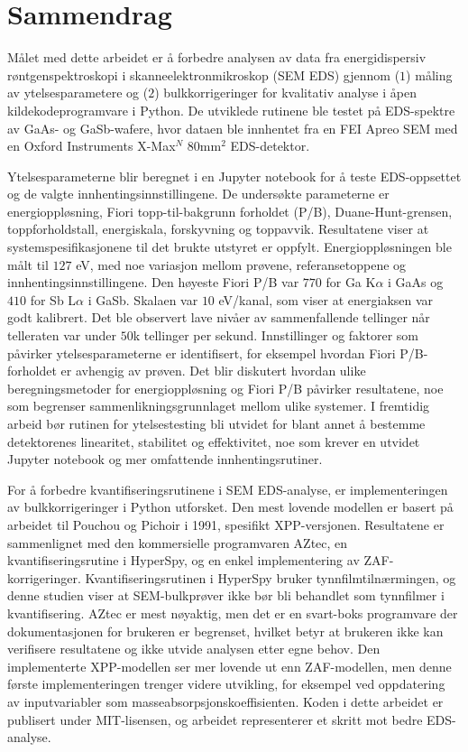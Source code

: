 \chapter*{Sammendrag}
\label{ch:Sammendrag}

Målet med dette arbeidet er å forbedre analysen av data fra energidispersiv røntgenspektroskopi i skanneelektronmikroskop (SEM EDS) gjennom ($1$) måling av ytelsesparametere og ($2$) bulkkorrigeringer for kvalitativ analyse i åpen kildekodeprogramvare i Python.
De utviklede rutinene ble testet på EDS-spektre av GaAs- og GaSb-wafere, hvor dataen ble innhentet fra en FEI Apreo SEM med en Oxford Instruments X-Max$^N$ $80$mm$^2$ EDS-detektor.


Ytelsesparameterne blir beregnet i en Jupyter notebook for å teste EDS-oppsettet og de valgte innhentingsinnstillingene. 
De undersøkte parameterne er energioppløsning, Fiori topp-til-bakgrunn forholdet (P/B), Duane-Hunt-grensen, toppforholdstall, energiskala, forskyvning og toppavvik. 
Resultatene viser at systemspesifikasjonene til det brukte utstyret er oppfylt.
Energioppløsningen ble målt til $127$ eV, med noe variasjon mellom prøvene, referansetoppene og innhentingsinnstillingene. 
Den høyeste Fiori P/B var $770$ for Ga K$\alpha$ i GaAs og $410$ for Sb L$\alpha$ i GaSb. 
Skalaen var $10$ eV/kanal, som viser at energiaksen var godt kalibrert.
Det ble observert lave nivåer av sammenfallende tellinger når telleraten var under $50$k tellinger per sekund. 
Innstillinger og faktorer som påvirker ytelsesparameterne er identifisert, for eksempel hvordan Fiori P/B-forholdet er avhengig av prøven. 
Det blir diskutert hvordan ulike beregningsmetoder for energioppløsning og Fiori P/B påvirker resultatene, noe som begrenser sammenlikningsgrunnlaget mellom ulike systemer.
I fremtidig arbeid bør rutinen for ytelsestesting bli utvidet for blant annet å bestemme detektorenes linearitet, stabilitet og effektivitet, noe som krever en utvidet Jupyter notebook og mer omfattende innhentingsrutiner.


For å forbedre kvantifiseringsrutinene i SEM EDS-analyse, er implementeringen av bulkkorrigeringer i Python utforsket.
Den mest lovende modellen er basert på arbeidet til Pouchou og Pichoir i 1991, spesifikt XPP-versjonen.
Resultatene er sammenlignet med den kommersielle programvaren AZtec, en kvantifiseringsrutine i HyperSpy, og en enkel implementering av ZAF-korrigeringer.
Kvantifiseringsrutinen i HyperSpy bruker tynnfilmtilnærmingen, og denne studien viser at SEM-bulkprøver ikke bør bli behandlet som tynnfilmer i kvantifisering.
AZtec er mest nøyaktig, men det er en svart-boks programvare der dokumentasjonen for brukeren er begrenset, hvilket betyr at brukeren ikke kan verifisere resultatene og ikke utvide analysen etter egne behov.
Den implementerte XPP-modellen ser mer lovende ut enn ZAF-modellen, men denne første implementeringen trenger videre utvikling, for eksempel ved oppdatering av inputvariabler som masseabsorpsjonskoeffisienten. 
Koden i dette arbeidet er publisert under MIT-lisensen, og arbeidet representerer et skritt mot bedre EDS-analyse. 